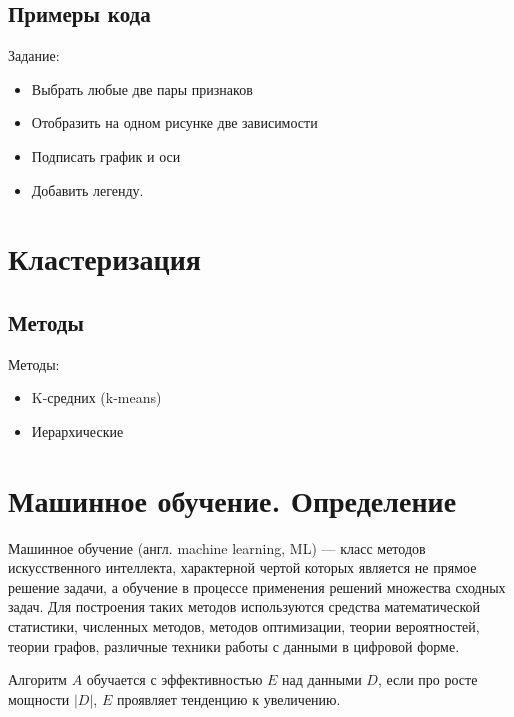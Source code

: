 \subsection{Примеры кода}

Задание:
\begin{itemize}
    \item Выбрать любые две пары признаков
    \item Отобразить на одном рисунке две зависимости
    \item Подписать график и оси
    \item Добавить легенду.
\end{itemize}

\section{Кластеризация}
\subsection{Методы}

Методы:
\begin{itemize}
    \item K-средних (k-means)
    \item Иерархические
\end{itemize}


\section{Машинное обучение. Определение}
Машинное обучение (англ. machine learning, ML) — класс методов искусственного интеллекта, характерной чертой которых является не прямое решение задачи, а обучение в процессе применения решений множества сходных задач. Для построения таких методов используются средства математической статистики, численных методов, методов оптимизации, теории вероятностей, теории графов, различные техники работы с данными в цифровой форме\cite{wiki:ml_def}.

Алгоритм $A$ обучается с эффективностью $E$ над данными $D$, если про росте мощности $|D|$, $E$ проявляет тенденцию к увеличению.
